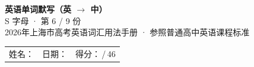 \documentclass[10pt,a4paper]{article}
\begin{document}
\pagestyle{plain}

\begin{center}
{\LARGE\bfseries 英语单词默写（英 $\to$ 中）}\\[0.22em]
{\large S 字母 · 第 6 / 9 份}\\[0.18em]
{\small 2026年上海市高考英语词汇用法手册 · 参照普通高中英语课程标准}
\end{center}

\vspace{0.25em}
\noindent\begin{tabular}{@{}p{}@{}p{}@{}p{}@{}}
姓名：\underline{\hspace{2.0cm}} & 日期：\underline{\hspace{2.0cm}} & 得分：\underline{\hspace{1.3cm}}\,/\,46 \\
\end{tabular}

\vspace{0.3em}

\vspace{0.08em}
\end{document}
